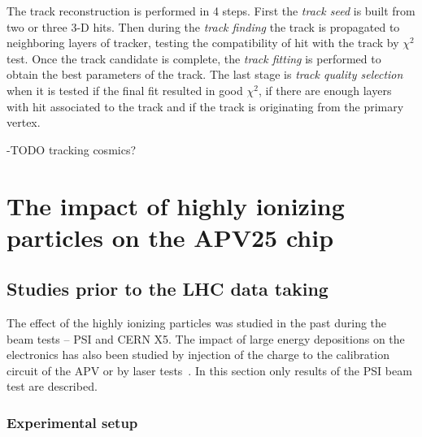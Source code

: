 The track reconstruction is performed in 4 steps. First the \textit{track seed} is built from two or three 3-D hits. Then during the \textit{track finding} the track is propagated to neighboring layers of tracker, testing the compatibility of hit with the track by $\chi^{2}$ test. Once the track candidate is complete, the \textit{track fitting} is performed to obtain the best parameters of the track. The last stage is \textit{track quality selection} when it is tested if the final fit resulted in good $\chi^{2}$, if there are enough layers with hit associated to the track and if the track is originating from the primary vertex.

-TODO tracking cosmics?

\section{The impact of highly ionizing particles on the APV25 chip}



\subsection{Studies prior to the LHC data taking~\label{sec:HIPinPast}}

The effect of the highly ionizing particles was studied in the past during the beam tests -- PSI and CERN X5. The impact of large energy depositions on the electronics has also been studied by injection of the charge to the calibration circuit of the APV or by laser tests~\cite{Adam:2005pz}. In this section only results of the PSI beam test are described.

\subsubsection{Experimental setup}

